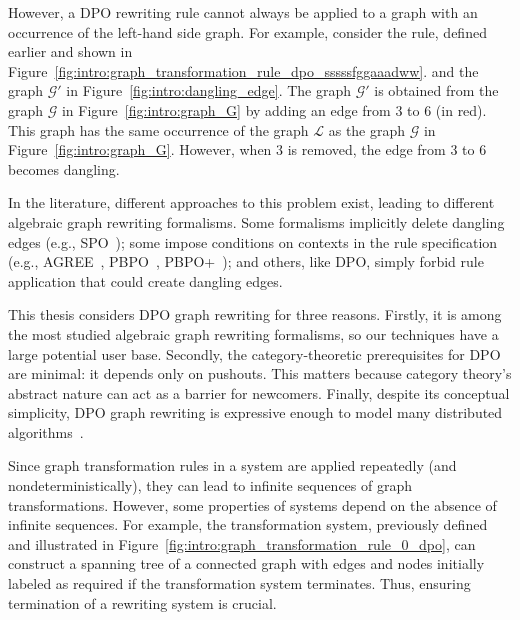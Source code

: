 However, a DPO rewriting rule cannot always be applied to a graph with an occurrence of the left-hand side graph.
For example, consider the rule, defined earlier and shown in Figure~\ref{fig:intro:graph_transformation_rule_dpo_sssssfggaaadww}. and the graph $\mathcal{G}'$ in Figure~\ref{fig:intro:dangling_edge}. The graph $\mathcal{G}'$ is obtained from the graph $\mathcal{G}$ in Figure~\ref{fig:intro:graph_G} by adding an edge from $3$ to $6$ (in red). This graph has the same occurrence of the graph $\mathcal{L}$ as the graph $\mathcal{G}$ in Figure~\ref{fig:intro:graph_G}.
However, when $3$ is removed, the edge from $3$ to $6$ becomes dangling.

In the literature, different approaches to this problem exist, leading to different algebraic graph rewriting formalisms. Some formalisms implicitly delete dangling edges (e.g., SPO~\cite{ehrig1997algebraic}); 
some impose conditions on contexts in the rule specification (e.g., AGREE~\cite{corradini2015agree}, PBPO~\cite{corradini2019thepbpo}, PBPO+~\cite{overbeek2023graph}); and others, like DPO, simply forbid rule application that could create dangling edges.

   This thesis considers DPO graph rewriting for three reasons.
   Firstly, it is among the most studied algebraic graph rewriting formalisms, so our techniques have a large potential user base.
   Secondly, the category-theoretic prerequisites for DPO are minimal: it depends only on pushouts. This matters because category theory's abstract nature can act as a barrier for newcomers.
    Finally, despite its conceptual simplicity, DPO graph rewriting is expressive enough to model many distributed algorithms~\cite{ehrig2006fundamentals,corradini1997algebraic}.
    
Since graph transformation rules in a system are applied repeatedly (and nondeterministically), they can lead to infinite sequences of graph transformations. However, some properties of systems depend on the absence of infinite sequences. For example, the transformation system, previously defined and illustrated in Figure~\ref{fig:intro:graph_transformation_rule_0_dpo}, can construct a spanning tree of a connected graph with edges and nodes initially labeled as required if the transformation system terminates. Thus, ensuring termination of a rewriting system is crucial.

